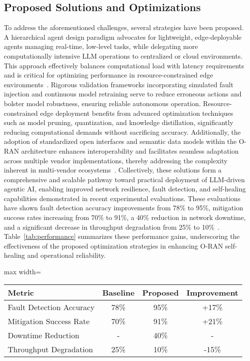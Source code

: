 \documentclass[sigconf]{acmart}
\begin{document}
\subsection{Proposed Solutions and Optimizations}

To address the aforementioned challenges, several strategies have been proposed. A hierarchical agent design paradigm advocates for lightweight, edge-deployable agents managing real-time, low-level tasks, while delegating more computationally intensive LLM operations to centralized or cloud environments. This approach effectively balances computational load with latency requirements and is critical for optimizing performance in resource-constrained edge environments~\cite{ref55}. Rigorous validation frameworks incorporating simulated fault injection and continuous model retraining serve to reduce erroneous actions and bolster model robustness, ensuring reliable autonomous operation. Resource-constrained edge deployment benefits from advanced optimization techniques such as model pruning, quantization, and knowledge distillation, significantly reducing computational demands without sacrificing accuracy. Additionally, the adoption of standardized open interfaces and semantic data models within the O-RAN architecture enhances interoperability and facilitates seamless adaptation across multiple vendor implementations, thereby addressing the complexity inherent in multi-vendor ecosystems~\cite{ref55}. Collectively, these solutions form a comprehensive and scalable pathway toward practical deployment of LLM-driven agentic AI, enabling improved network resilience, fault detection, and self-healing capabilities demonstrated in recent experimental evaluations. These evaluations have shown fault detection accuracy improvements from 78\% to 95\%, mitigation success rates increasing from 70\% to 91\%, a 40\% reduction in network downtime, and a significant decrease in throughput degradation from 25\% to 10\%~\cite{ref55}. Table~\ref{tab:performance} summarizes these performance gains, underscoring the effectiveness of the proposed optimization strategies in enhancing O-RAN self-healing and operational reliability.

\begin{table*}[htbp]
\centering
\caption{Performance Improvements of LLM-Driven Agentic AI in O-RAN Self-Healing~\cite{ref55}}
\label{tab:performance}
\begin{adjustbox}{max width=\textwidth}
\begin{tabular}{@{}lccc@{}}
\toprule
Metric & Baseline & Proposed & Improvement \\ \midrule
Fault Detection Accuracy & 78\% & 95\% & +17\% \\
Mitigation Success Rate & 70\% & 91\% & +21\% \\
Downtime Reduction & - & 40\% & - \\
Throughput Degradation & 25\% & 10\% & -15\% \\ \bottomrule
\end{tabular}
\end{adjustbox}
\end{table*}
\end{document}
